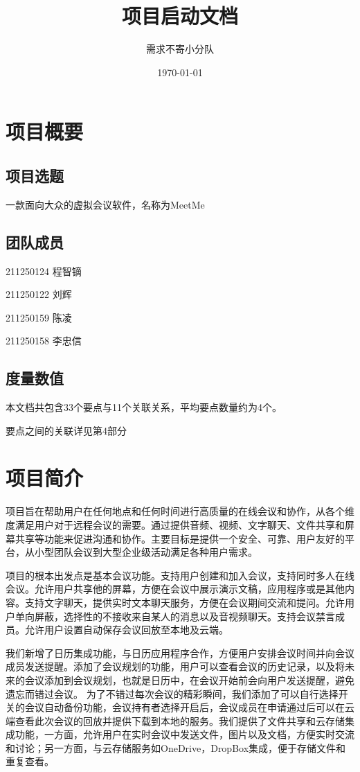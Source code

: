\documentclass[a4paper,12pt]{article}
\title{项目启动文档}
\author{需求不寄小分队}
\date{\today}
\begin{document}
    \maketitle

    \tableofcontents

    \section{项目概要}

    \subsection{项目选题}
    一款面向大众的虚拟会议软件，名称为MeetMe
    \subsection{团队成员}
    211250124 程智镝

    211250122 刘辉

    211250159 陈凌

    211250158 李忠信
    \subsection{度量数值}
    本文档共包含33个要点与11个关联关系，平均要点数量约为4个。

    要点之间的关联详见第4部分

    \section{项目简介}
    项目旨在帮助用户在任何地点和任何时间进行高质量的在线会议和协作，从各个维度满足用户对于远程会议的需要。通过提供音频、视频、文字聊天、文件共享和屏幕共享等功能来促进沟通和协作。主要目标是提供一个安全、可靠、用户友好的平台，从小型团队会议到大型企业级活动满足各种用户需求。

    项目的根本出发点是基本会议功能。支持用户创建和加入会议，支持同时多人在线会议。允许用户共享他的屏幕，方便在会议中展示演示文稿，应用程序或是其他内容。支持文字聊天，提供实时文本聊天服务，方便在会议期间交流和提问。允许用户单向屏蔽，选择性的不接收来自某人的消息以及音视频聊天。支持会议禁言成员。允许用户设置自动保存会议回放至本地及云端。

    我们新增了日历集成功能，与日历应用程序合作，方便用户安排会议时间并向会议成员发送提醒。添加了会议规划的功能，用户可以查看会议的历史记录，以及将未来的会议添加到会议规划，也就是日历中，在会议开始前会向用户发送提醒，避免遗忘而错过会议。
    为了不错过每次会议的精彩瞬间，我们添加了可以自行选择开关的会议自动备份功能，会议持有者选择开启后，会议成员在申请通过后可以在云端查看此次会议的回放并提供下载到本地的服务。我们提供了文件共享和云存储集成功能，一方面，允许用户在实时会议中发送文件，图片以及文档，方便实时交流和讨论；另一方面，与云存储服务如OneDrive，DropBox集成，便于存储文件和重复查看。
\end{document}
